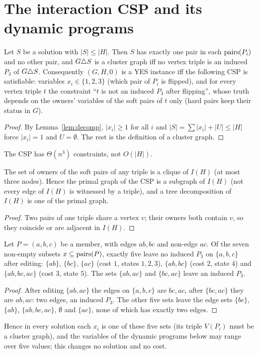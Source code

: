 \section{The interaction CSP and its dynamic programs}\label{sec:csp}\label{sec:l0}\label{sec:excess}
\begin{observation}\label{obs:one}
Let $S$ be a solution with $|S|\le|H|$. Then $S$ has exactly one pair in each $\mathrm{pairs}(P_i)$ and no other pair, and $G\triangle S$ is a cluster graph iff no vertex triple is an induced $P_3$ of $G\triangle S$. Consequently $(G,H,0)$ is a YES instance iff the following CSP is satisfiable: variables $x_i\in\{1,2,3\}$ (which pair of $P_i$ is flipped), and for every vertex triple $t$ the constraint ``$t$ is not an induced $P_3$ after flipping'', whose truth depends on the owners' variables of the soft pairs of $t$ only (hard pairs keep their status in $G$).
\end{observation}
\begin{proof}
By Lemma~\ref{lem:decomp}, $|x_i|\ge1$ for all $i$ and $|S|=\sum|x_i|+|U|\le|H|$ force $|x_i|=1$ and $U=\emptyset$. The rest is the definition of a cluster graph.
\end{proof}
The CSP has $\Theta(n^3)$ constraints, not $O(|H|)$.
\begin{observation}\label{obs:two}
The set of owners of the soft pairs of any triple is a clique of $I(H)$ (at most three nodes). Hence the primal graph of the CSP is a subgraph of $I(H)$ (not every edge of $I(H)$ is witnessed by a triple), and a tree decomposition of $I(H)$ is one of the primal graph.
\end{observation}
\begin{proof}
Two pairs of one triple share a vertex $v$; their owners both contain $v$, so they coincide or are adjacent in $I(H)$.
\end{proof}
\begin{lemma}\label{lem:five}
Let $P=(a,b,c)$ be a member, with edges $ab,bc$ and non-edge $ac$. Of the seven non-empty subsets $x\subseteq\mathrm{pairs}(P)$, exactly five leave no induced $P_3$ on $\{a,b,c\}$ after editing: $\{ab\}$, $\{bc\}$, $\{ac\}$ (cost $1$, states $1,2,3$), $\{ab,bc\}$ (cost $2$, state $4$) and $\{ab,bc,ac\}$ (cost $3$, state $5$). The sets $\{ab,ac\}$ and $\{bc,ac\}$ leave an induced $P_3$.
\end{lemma}
\begin{proof}
After editing $\{ab,ac\}$ the edges on $\{a,b,c\}$ are $bc,ac$, after $\{bc,ac\}$ they are $ab,ac$: two edges, an induced $P_3$. The other five sets leave the edge sets $\{bc\}$, $\{ab\}$, $\{ab,bc,ac\}$, $\emptyset$ and $\{ac\}$, none of which has exactly two edges.
\end{proof}
Hence in every solution each $x_i$ is one of these five sets (its triple $V(P_i)$ must be a cluster graph), and the variables of the dynamic programs below may range over five values; this changes no solution and no cost.

